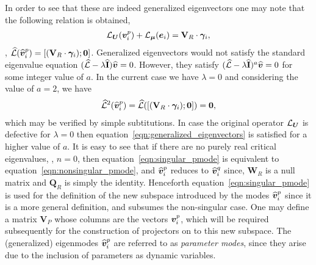 In order to see that these are indeed generalized eigenvectors one may note that the following relation is obtained,
\begin{eqnarray}
	\mathcal{L}_{\boldsymbol{U}}(\boldsymbol{v}^{p}_{i}) + \mathcal{L}_{\boldsymbol{\mu}}(\boldsymbol{e}_{i}) = \mathbf{V}_{R}\cdot\boldsymbol{\gamma}_{i},
\end{eqnarray}
\ie, $\mathcal{\widehat{L}}({\widehat{\boldsymbol{v}}}^{p}_{i}) = [(\mathbf{V}_{R}\cdot\boldsymbol{\gamma}_{i}); \boldsymbol{0}]$. Generalized eigenvectors would not satisfy the standard eigenvalue equation $(\mathcal{\widehat{L}} - \lambda\mathbf{\widehat{I}}){\widehat{\boldsymbol{v}}} = 0$. However, they satisfy $(\mathcal{\widehat{L}} - \lambda\mathbf{\widehat{I}})^{a}{\widehat{\boldsymbol{v}}} = 0$ for some integer value of $a$. In the current case we have $\lambda = 0$ and considering the value of $a=2$, we have
\begin{eqnarray}
	\label{eqn:generalized_eigenvectors}
	\mathcal{\widehat{L}}^{2}({\widehat{\boldsymbol{v}}}^{p}_{i}) = \mathcal{\widehat{L}}([(\mathbf{V}_{R}\cdot\boldsymbol{\gamma}_{i}); \boldsymbol{0}]) = \boldsymbol{0},
\end{eqnarray}
which may be verified by simple subtitutions. In case the original operator $\mathcal{L}_{\boldsymbol{U}}$ is defective for $\lambda = 0$ then equation~\eqref{eqn:generalized_eigenvectors} is satisfied for a higher value of $a$. 
It is easy to see that if there are no purely real critical eigenvalues, \ie, $n = 0$, then equation~\eqref{eqn:singular_pmode} is equivalent to equation~\eqref{eqn:nonsingular_pmode}, and ${\widehat{\boldsymbol{v}}}^{p}_{i}$ reduces to ${\widehat{\boldsymbol{v}}}^{q}_{i}$ since, $\mathbf{W}_{R}$ is a null matrix and $\mathbf{Q}_{R}$ is simply the identity. Henceforth equation~\eqref{eqn:singular_pmode} is used for the definition of the new subspace introduced by the modes ${\widehat{\boldsymbol{v}}}^{p}_{i}$ since it is a more general definition, and subsumes the non-singular case. One may define a matrix $\mathbf{V}_{P}$ whose columns are the vectors $\boldsymbol{v}^{p}_{i}$, which will be required subsequently for the construction of projectors on to this new subspace. The (generalized) eigenmodes ${\widehat{\boldsymbol{v}}}^{p}_{i}$ are referred to as \emph{parameter modes}, since they arise due to the inclusion of parameters as dynamic variables.

